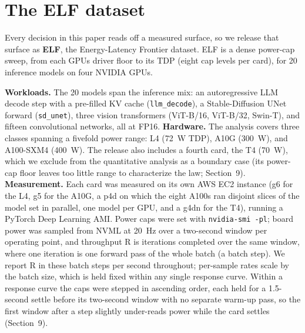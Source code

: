 \section{The ELF dataset}\label{the-elf-dataset}

Every decision in this paper reads off a measured surface, so we release that surface as \textbf{ELF}, the
Energy-Latency Frontier dataset. ELF is a dense power-cap sweep, from each GPU\textquotesingle s
driver floor to its TDP (eight cap levels per card), for 20 inference models on four NVIDIA GPUs.

\textbf{Workloads.} The 20 models span the inference mix: an autoregressive LLM decode step with a pre-filled
KV cache (\texttt{llm\_decode}), a Stable-Diffusion UNet forward (\texttt{sd\_unet}), three vision
transformers (ViT-B/16, ViT-B/32, Swin-T), and fifteen convolutional networks, all at FP16. \textbf{Hardware.}
The analysis covers three classes spanning a fivefold power range: L4 (72~W TDP), A10G (300~W), and
A100-SXM4 (400~W). The release also includes a fourth card, the T4 (70~W), which we exclude from the
quantitative analysis as a boundary case (its power-cap floor leaves too little range to characterize the law;
Section~9). \textbf{Measurement.} Each card was measured on its own AWS EC2 instance (g6 for the L4, g5 for
the A10G, a p4d on which the eight A100s ran disjoint slices of the model set in parallel, one model per GPU, and a g4dn for the T4), running a PyTorch Deep Learning AMI. Power caps
were set with \texttt{nvidia-smi\ -pl}; board power was sampled from
NVML at 20~Hz over a two-second window per operating point, and throughput R is iterations completed over
the same window, where one iteration is one forward pass of the whole batch (a batch step). We report R in
these batch steps per second throughout; per-sample rates scale by the batch size, which is held fixed within
any single response curve. Within a response curve the caps were stepped in ascending order, each held for a 1.5-second settle before its two-second window with no separate warm-up pass, so the first window after a step slightly under-reads power while the card settles (Section~9).

